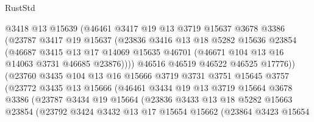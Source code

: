 \begin{lexlean}{RustStd}
\begin{coremodule}
                      @3418
                      @13
                      @15639
                      (@46461
                        @3417
                        @19
                        @13
                        @3719
                        @15637
                        @3678
                        @3386
                        (@23787
                          @3417
                          @19
                          @15637
                          (@23836
                            @3416
                            @13
                            @18
                            @5282
                            @15636
                            @23854
                            (@46687
                              @3415
                              @13
                              @17
                              @14069
                              @15635
                              @46701
                              (@46671 @104 @13 @16 @14063 @3731 @46685 @23876))))
                        @46516
                        @46519
                        @46522
                        @46525
                        @17776))
                    (@23760
                      @3435
                      @104
                      @13
                      @16
                      @15666
                      @3719
                      @3731
                      @3751
                      @15645
                      @3757
                      (@23772
                        @3435
                        @13
                        @15666
                        (@46461
                          @3434
                          @19
                          @13
                          @3719
                          @15664
                          @3678
                          @3386
                          (@23787
                            @3434
                            @19
                            @15664
                            (@23836
                              @3433
                              @13
                              @18
                              @5282
                              @15663
                              @23854
                              (@23792
                                @3424
                                @3432
                                @13
                                @17
                                @15654
                                @15662
                                (@23864
                                  @3423
                                  @15654

\end{coremodule}
\end{lexlean}
